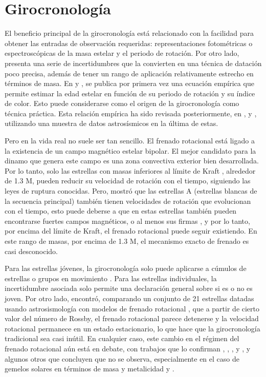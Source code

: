 \section{Girocronología}
El beneficio principal de la girocronología está relacionado con la facilidad para obtener las entradas de observación requeridas: representaciones fotométricas o espectroscópicas de la masa estelar y el periodo de rotación. Por otro lado, presenta una serie de incertidumbres que la convierten en una técnica de datación poco precisa, además de tener un rango de aplicación relativamente estrecho en términos de masa. En \cite{Barnes03} y \cite{Barnes07}, se publica por primera vez una ecuación empírica que permite estimar la edad estelar en función de su periodo de rotación y su índice de color. Esto puede considerarse como el origen de la girocronología como técnica práctica. Esta relación empírica ha sido revisada posteriormente, en \cite{MH}, \cite{Barnes10} y \cite{Angus15}, utilizando una muestra de datos astrosísmicos en la última de estas. 

Pero en la vida real no suele ser tan sencillo. El frenado rotacional está ligado a la existencia de un campo magnético estelar bipolar. El mejor candidato para la dinamo que genera este campo es una zona convectiva exterior bien desarrollada. Por lo tanto, solo las estrellas con masas inferiores al límite de Kraft \cite{Kraft67}, alrededor de 1.3 M, pueden reducir su velocidad de rotación con el tiempo, siguiendo las leyes de ruptura conocidas. Pero, \cite{Zorec12} mostró que las estrellas A (estrellas blancas de la secuencia principal) también tienen velocidades de rotación que evolucionan con el tiempo, esto puede deberse a que en estas estrellas también pueden encontrarse fuertes campos magnéticos, o al menos sus firmas \cite{Balona17}, y por lo tanto, por encima del límite de Kraft, el frenado rotacional puede seguir existiendo. En este rango de masas, por encima de 1.3 M, el mecanismo exacto de frenado es casi desconocido.

Para las estrellas jóvenes, la girocronología solo puede aplicarse a cúmulos de estrellas o grupos en movimiento \cite{Curtis19}. Para las estrellas individuales, la incertidumbre asociada solo permite una declaración general sobre si es o no es joven. Por otro lado, \cite{Saders16} encontró, comparando un conjunto de 21 estrellas datadas usando astrosismología con modelos de frenado rotacional \cite{Saders13}, que a partir de cierto valor del número de Rossby, el frenado rotacional parece detenerse y la velocidad rotacional permanece en un estado estacionario, lo que hace que la girocronología tradicional sea casi inútil. En cualquier caso, este cambio en el régimen del frenado rotacional aún está en debate, con trabajos que lo confirman \cite{Gordon21}, \cite{Kitchatinov17}, \cite{Metcalfe19}, \cite{Metcalfe17} y \cite{Saders19}, y algunos otros que concluyen que no se observa, especialmente en el caso de gemelos solares en términos de masa y metalicidad \cite{Barnes16} y \cite{Oliveira19}.

